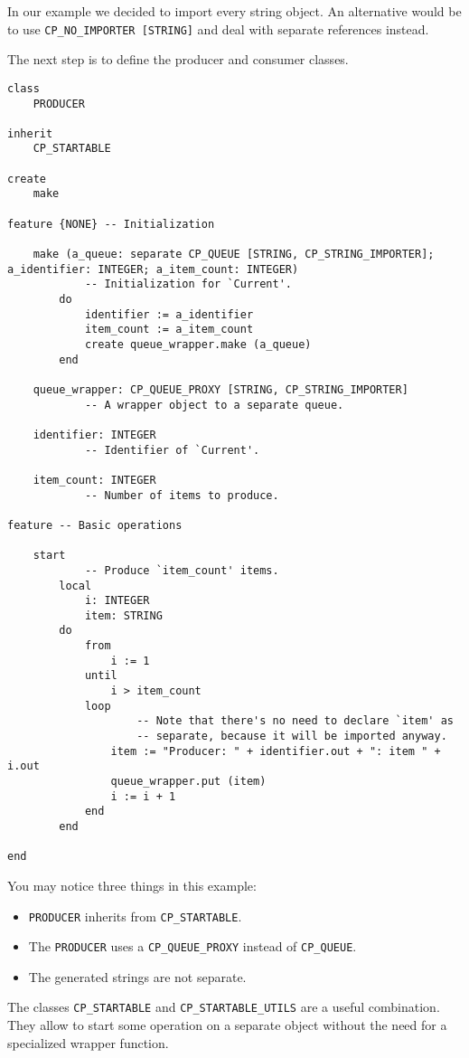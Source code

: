 In our example we decided to import every string object.
An alternative would be to use \lstinline!CP_NO_IMPORTER [STRING]! and deal with separate references instead.

The next step is to define the producer and consumer classes.

\begin{lstlisting}[language=OOSC2Eiffel, captionpos=b, caption={The producer class.}]
class
	PRODUCER

inherit
	CP_STARTABLE

create
	make

feature {NONE} -- Initialization

	make (a_queue: separate CP_QUEUE [STRING, CP_STRING_IMPORTER]; a_identifier: INTEGER; a_item_count: INTEGER)
			-- Initialization for `Current'.
		do
			identifier := a_identifier
			item_count := a_item_count
			create queue_wrapper.make (a_queue)
		end

	queue_wrapper: CP_QUEUE_PROXY [STRING, CP_STRING_IMPORTER]
			-- A wrapper object to a separate queue.

	identifier: INTEGER
			-- Identifier of `Current'.

	item_count: INTEGER
			-- Number of items to produce.

feature -- Basic operations

	start
			-- Produce `item_count' items.
		local
			i: INTEGER
			item: STRING
		do
			from
				i := 1
			until
				i > item_count
			loop
					-- Note that there's no need to declare `item' as 
					-- separate, because it will be imported anyway.
				item := "Producer: " + identifier.out + ": item " + i.out
				queue_wrapper.put (item)
				i := i + 1
			end
		end

end
\end{lstlisting}

You may notice three things in this example:

\begin{itemize}
 \item \lstinline!PRODUCER! inherits from \lstinline!CP_STARTABLE!.
 \item The \lstinline!PRODUCER! uses a \lstinline!CP_QUEUE_PROXY! instead of \lstinline!CP_QUEUE!.
 \item The generated strings are not separate.
\end{itemize}

The classes \lstinline!CP_STARTABLE! and \lstinline!CP_STARTABLE_UTILS! are a useful combination.
They allow to start some operation on a separate object without the need for a specialized wrapper function.


